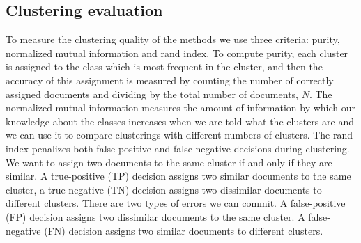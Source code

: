 \documentclass[runningheads]{llncs}
\begin{document}
\subsection{Clustering evaluation}

To measure the clustering quality of the methods we
use three criteria: purity, normalized mutual information and rand index. 
To compute purity, each cluster is assigned to the class which is most frequent
in the cluster, and then the accuracy of this assignment is measured
by counting the number of correctly assigned documents and dividing by the total number of documents, $N$.
The normalized mutual information measures the amount of information by which our knowledge about the classes increases when we are told what the clusters are and  we can use it to compare clusterings with different numbers of clusters. 
The rand index penalizes both
false-positive and false-negative decisions during clustering.
We want to assign two documents to the same
cluster if and only if they are similar. A true-positive (TP) decision assigns
two similar documents to the same cluster, a true-negative (TN) decision assigns
two dissimilar documents to different clusters. There are two types of
errors we can commit. A false-positive (FP) decision assigns two dissimilar
documents to the same cluster. A false-negative (FN) decision assigns two
similar documents to different clusters.







\end{document}
